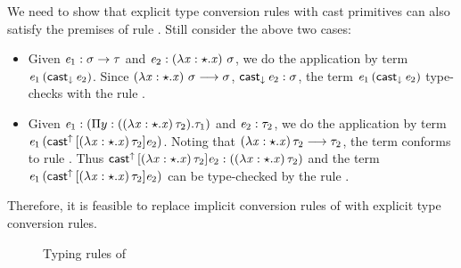 We need to show that explicit type conversion rules with cast primitives can also satisfy the premises of rule . Still consider the above two cases:
\begin{itemize}
\item Given $\mathit{e_{{\mathrm{1}}}}:\sigma  \rightarrow  \tau$ and $\mathit{e_{{\mathrm{2}}}} : (\lambda  \mathit{x}  :  \star  .  \mathit{x})~\sigma$, we do the application by term $\mathit{e_{{\mathrm{1}}}} \, (  \mathsf{cast}_{\downarrow} \, \mathit{e_{{\mathrm{2}}}}  )$. Since $(\lambda  \mathit{x}  :  \star  .  \mathit{x})~\sigma  \longrightarrow  \sigma$, $\mathsf{cast}_{\downarrow} \, \mathit{e_{{\mathrm{2}}}} : \sigma$, the term $\mathit{e_{{\mathrm{1}}}} \, (  \mathsf{cast}_{\downarrow} \, \mathit{e_{{\mathrm{2}}}}  )$ type-checks with the rule .
\item Given $\mathit{e_{{\mathrm{1}}}} : ( \Pi  y:((  \lambda  \mathit{x}  :  \star  .  \mathit{x}  ) \, \tau_{{\mathrm{2}}}).\tau_{{\mathrm{1}}})$ and $\mathit{e_{{\mathrm{2}}}} : \tau_{{\mathrm{2}}}$, we do the application by term $\mathit{e_{{\mathrm{1}}}} \, (  \mathsf{cast}^{\uparrow} \, [  (  \lambda  \mathit{x}  :  \star  .  \mathit{x}  ) \, \tau_{{\mathrm{2}}}  ]  \mathit{e_{{\mathrm{2}}}}  )$. Noting that $(  \lambda  \mathit{x}  :  \star  .  \mathit{x}  ) \, \tau_{{\mathrm{2}}}  \longrightarrow  \tau_{{\mathrm{2}}}$, the term conforms to rule . Thus $\mathsf{cast}^{\uparrow} \, [  (  \lambda  \mathit{x}  :  \star  .  \mathit{x}  ) \, \tau_{{\mathrm{2}}}  ]  \mathit{e_{{\mathrm{2}}}} : (  (  \lambda  \mathit{x}  :  \star  .  \mathit{x}  ) \, \tau_{{\mathrm{2}}}  )$ and the term $\mathit{e_{{\mathrm{1}}}} \, (  \mathsf{cast}^{\uparrow} \, [  (  \lambda  \mathit{x}  :  \star  .  \mathit{x}  ) \, \tau_{{\mathrm{2}}}  ]  \mathit{e_{{\mathrm{2}}}}  )$ can be type-checked by the rule .
\end{itemize}

Therefore, it is feasible to replace implicit conversion rules of \cc with explicit type conversion rules.

\begin{figure}[ht]
	\ottdefnexpr{}
	\caption{Typing rules of \expcc}
	\label{fig:ecc:typerule}
\end{figure}


